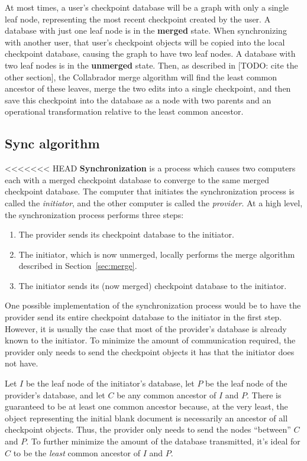 \documentclass[11pt,titlepage]{article}
\begin{document}
At most times, a user's checkpoint database will be a graph with only
a single leaf node, representing the most recent checkpoint created by
the user. A database with just one leaf node is in the \textbf{merged}
state. When synchronizing with another user, that user's checkpoint
objects will be copied into the local checkpoint database, causing the
graph to have two leaf nodes. A database with two leaf nodes is in the
\textbf{unmerged} state. Then, as described in [TODO: cite the other
section], the Collabrador merge algorithm will find the least common
ancestor of these leaves, merge the two edits into a single
checkpoint, and then save this checkpoint into the database as a node
with two parents and an operational transformation relative to the
least common ancestor.

\subsection{Sync algorithm}

<<<<<<< HEAD
\textbf{Synchronization} is a process which causes two computers each with a merged checkpoint database to converge to the same merged checkpoint database. The computer that initiates the synchronization process is called the \emph{initiator}, and the other computer is called the \emph{provider}. At a high level, the synchronization process performs three steps:
\begin{enumerate}
\item The provider sends its checkpoint database to the initiator.
\item The initiator, which is now unmerged, locally performs the merge algorithm described in Section~\ref{sec:merge}.
\item The initiator sends its (now merged) checkpoint database to the initiator.
\end{enumerate}
One possible implementation of the synchronization process would be to have the provider send its entire checkpoint database to the initiator in the first step. However, it is usually the case that most of the provider's database is already known to the initiator. To minimize the amount of communication required, the provider only needs to send the checkpoint objects it has that the initiator does not have.

Let $I$ be the leaf node of the initiator's database, let $P$ be the leaf node of the provider's database, and let $C$ be any common ancestor of $I$ and $P$. There is guaranteed to be at least one common ancestor because, at the very least, the object representing the initial blank document is necessarily an ancestor of all checkpoint objects. Thus, the provider only needs to send the nodes ``between'' $C$ and $P$. To further minimize the amount of the database transmitted, it's ideal for $C$ to be the \emph{least} common ancestor of $I$ and $P$.
\end{document}
